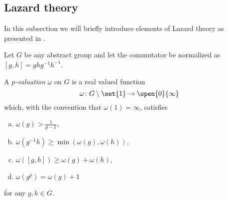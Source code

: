 


\subsection{Lazard theory}%
\label{subsec:Laz-theory}

In this subsection we will briefly introduce elements of Lazard theory as presented in \cite{Sch}.

Let $G$ be any abstract group and let the commutator be normalized as $[g,h]=ghg^{-1}h^{-1}$.

\begin{definition}
  A \emph{$p$-valuation} $\omega$ on $G$ is a real valued function
  \begin{equation*}
    \omega \colon G \setminus \set{1} \to \open{0}{\infty}
  \end{equation*}%
  which, with the convention that $\omega(1)=\infty$, satisfies
  \begin{enumerate}[(a)]
    \item $\omega(g) > \tfrac{1}{p-1}$,
    \item $\omega(g^{-1}h) \geq \min(\omega(g),\omega(h))$,
    \item $\omega([g,h]) \geq \omega(g) + \omega(h)$,
    \item $\omega(g^p) = \omega(g)+1$
  \end{enumerate}
  for any $g,h\in G$.
\end{definition}

